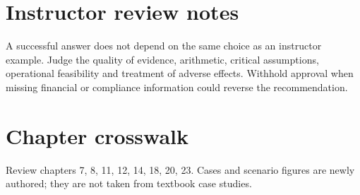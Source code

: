 \documentclass[11pt]{article}
\begin{document}
\section{Instructor review notes}
A successful answer does not depend on the same choice as an instructor example. Judge the quality of evidence, arithmetic, critical assumptions, operational feasibility and treatment of adverse effects. Withhold approval when missing financial or compliance information could reverse the recommendation.
\section{Chapter crosswalk}
Review chapters 7, 8, 11, 12, 14, 18, 20, 23. Cases and scenario figures are newly authored; they are not taken from textbook case studies.
\end{document}
